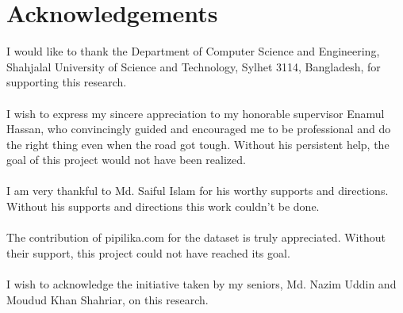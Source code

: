 \documentclass{standalone}
\begin{document}
\chapter*{Acknowledgements}
I would like to thank the Department of Computer Science and Engineering, Shahjalal University of Science and Technology, Sylhet 3114, Bangladesh, for supporting this research.\\
\\
I wish to express my sincere appreciation to my honorable supervisor Enamul Hassan, who convincingly guided and encouraged me to be professional and do the right thing even when the road got tough. Without his persistent help, the goal of this project would not have been realized.\\
\\
I am very thankful to Md. Saiful Islam for his worthy supports and directions. Without his supports and directions this work couldn't be done. \\
\\
 The contribution of pipilika.com for the dataset is truly appreciated. Without their support, this project could not have reached its goal.\\
 \\
I wish to acknowledge the initiative taken by my seniors, Md. Nazim Uddin and Moudud Khan Shahriar, on this research.
\end{document}
